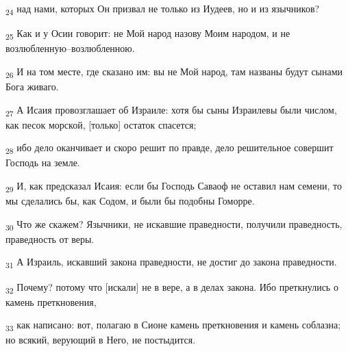 \begin{tcolorbox}
\textsubscript{24} над нами, которых Он призвал не только из Иудеев, но и из язычников?
\end{tcolorbox}
\begin{tcolorbox}
\textsubscript{25} Как и у Осии говорит: не Мой народ назову Моим народом, и не возлюбленную--возлюбленною.
\end{tcolorbox}
\begin{tcolorbox}
\textsubscript{26} И на том месте, где сказано им: вы не Мой народ, там названы будут сынами Бога живаго.
\end{tcolorbox}
\begin{tcolorbox}
\textsubscript{27} А Исаия провозглашает об Израиле: хотя бы сыны Израилевы были числом, как песок морской, [только] остаток спасется;
\end{tcolorbox}
\begin{tcolorbox}
\textsubscript{28} ибо дело оканчивает и скоро решит по правде, дело решительное совершит Господь на земле.
\end{tcolorbox}
\begin{tcolorbox}
\textsubscript{29} И, как предсказал Исаия: если бы Господь Саваоф не оставил нам семени, то мы сделались бы, как Содом, и были бы подобны Гоморре.
\end{tcolorbox}
\begin{tcolorbox}
\textsubscript{30} Что же скажем? Язычники, не искавшие праведности, получили праведность, праведность от веры.
\end{tcolorbox}
\begin{tcolorbox}
\textsubscript{31} А Израиль, искавший закона праведности, не достиг до закона праведности.
\end{tcolorbox}
\begin{tcolorbox}
\textsubscript{32} Почему? потому что [искали] не в вере, а в делах закона. Ибо преткнулись о камень преткновения,
\end{tcolorbox}
\begin{tcolorbox}
\textsubscript{33} как написано: вот, полагаю в Сионе камень преткновения и камень соблазна; но всякий, верующий в Него, не постыдится.
\end{tcolorbox}
